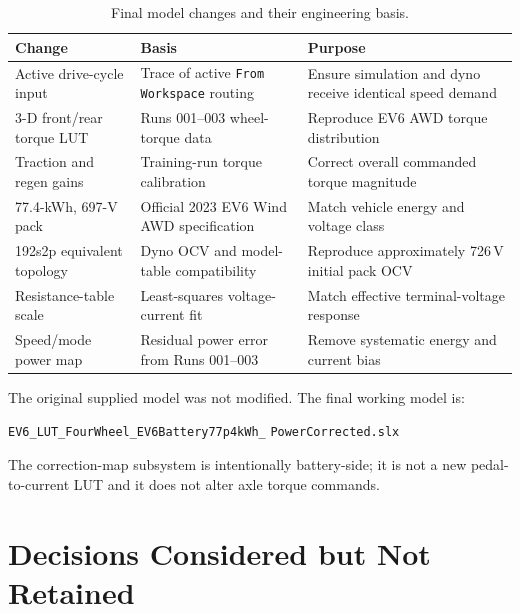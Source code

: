 \documentclass[11pt,letterpaper]{article}
\newcommand{\SI}[2]{#1\,#2}
\begin{document}
\begin{table}[H]
\centering
\caption{Final model changes and their engineering basis.}
\begin{tabularx}{\textwidth}{p{}Y Y}
\toprule
Change & Basis & Purpose \\
\midrule
Active drive-cycle input & Trace of active \texttt{From Workspace} routing & Ensure simulation and dyno receive identical speed demand \\
3-D front/rear torque LUT & Runs 001--003 wheel-torque data & Reproduce EV6 AWD torque distribution \\
Traction and regen gains & Training-run torque calibration & Correct overall commanded torque magnitude \\
77.4-kWh, 697-V pack & Official 2023 EV6 Wind AWD specification & Match vehicle energy and voltage class \\
192s2p equivalent topology & Dyno OCV and model-table compatibility & Reproduce approximately \SI{726}{V} initial pack OCV \\
Resistance-table scale & Least-squares voltage-current fit & Match effective terminal-voltage response \\
Speed/mode power map & Residual power error from Runs 001--003 & Remove systematic energy and current bias \\
\bottomrule
\end{tabularx}
\end{table}

The original supplied model was not modified. The final working model is:
\begin{center}
\small\texttt{EV6\_LUT\_FourWheel\_EV6Battery77p4kWh\_}\allowbreak
\texttt{PowerCorrected.slx}
\end{center}
The correction-map subsystem is intentionally battery-side; it is not a new
pedal-to-current LUT and it does not alter axle torque commands.

\section{Decisions Considered but Not Retained}
\end{document}
